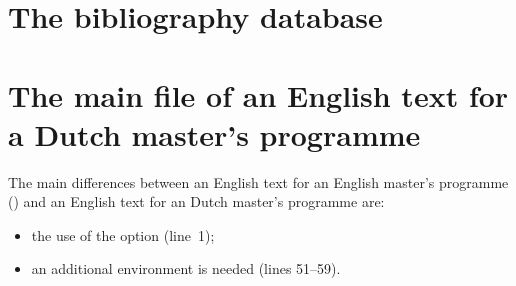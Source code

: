 \section{The bibliography database}
\label{sec:file:bib}

\section{The main file of an English text for a Dutch master's programme}
\label{sec:file:hoofd}

The main differences between an English text for an English master's programme
() and an English text for an Dutch master's programme are:
\begin{itemize}
\item the use of the  option (line~1);
\item an additional  environment is needed (lines 51--59).
\end{itemize}
\medskip


